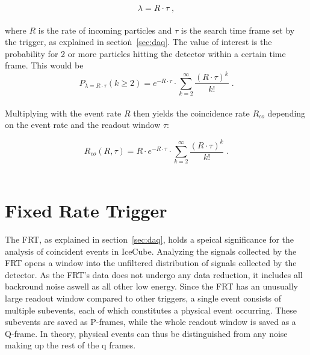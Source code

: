\begin{equation}
    \lambda = R \cdot \tau \; ,
\end{equation}\\

where $R$ is the rate of incoming particles and $\tau$ is the search time frame set by the trigger, as explained in section\.~\ref{sec:daq}. 
The value of interest is the probability for 2 or more particles hitting the detector within a certain time frame. This would be \\

\begin{equation}
    P_{\lambda = R\cdot\tau}(k\geq2) = e^{- R\cdot\tau} \cdot \sum_{k=2}^\infty \frac{{(R\cdot\tau)}^k}{k!} \; .
\end{equation}\\ 

Multiplying with the event rate $R$ then yields the coincidence rate $R_{co}$ depending on the event rate and the readout window $\tau$:

\begin{equation}
    R_{co}(R,\tau) = R \cdot e^{- R\cdot\tau} \cdot \sum_{k=2}^\infty \frac{{(R\cdot\tau)}^k}{k!}\;.
    \label{eq:multi_rate}
\end{equation}\\

\section{Fixed Rate Trigger}\label{sec:frt}

The FRT, as explained in section\@~\ref{sec:daq}, holds a speical significance for the analysis of coincident events in IceCube. 
Analyzing the signals collected by the FRT opens a window into the unfiltered distribution of signals collected by the detector. 
As the FRT's data does not undergo any data reduction, it includes all backround noise aswell as all other low energy. 
Since the FRT has an unusually large readout window compared to other triggers, a single event consists of multiple subevents, each of which constitutes
a physical event occurring. These subevents are saved as P-frames, while the whole readout window is saved as a Q-frame.
In theory, physical events can thus be distinguished from any noise making up the rest of the q frames.  

